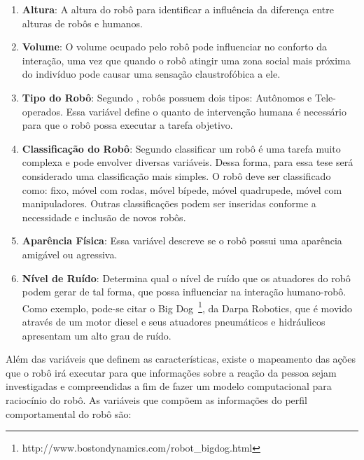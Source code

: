 \begin{enumerate}
	\item \textbf{Altura}: A altura do robô para identificar a influência da diferença entre alturas de robôs e humanos.
	\item \textbf{Volume}: O volume ocupado pelo robô pode influenciar no conforto da interação, uma vez que quando o robô atingir uma zona social mais próxima do indivíduo pode causar uma sensação claustrofóbica a ele.
	\item \textbf{Tipo do Robô}: Segundo , robôs possuem dois tipos: Autônomos e Tele-operados. Essa variável define o quanto de intervenção humana é necessário para que o robô possa executar a tarefa objetivo.
	\item \textbf{Classificação do Robô}: Segundo  classificar um robô é uma tarefa muito complexa e pode envolver diversas variáveis. Dessa forma, para essa tese será considerado uma classificação mais simples. O robô deve ser classificado como: fixo, móvel com rodas, móvel bípede, móvel quadrupede, móvel com manipuladores. Outras classificações podem ser inseridas conforme a necessidade e inclusão de novos robôs.
	\item \textbf{Aparência Física}: Essa variável descreve se o robô possui uma aparência amigável ou agressiva.
	\item \textbf{Nível de Ruído}: Determina qual o nível de ruído que os atuadores do robô podem gerar de tal forma, que possa influenciar na interação humano-robô. Como exemplo, pode-se citar o Big Dog~\footnote{http://www.bostondynamics.com/robot\_bigdog.html}, da Darpa Robotics, que é movido através de um motor diesel e seus atuadores pneumáticos e hidráulicos apresentam um alto grau de ruído.
\end{enumerate}

Além das variáveis que definem as características, existe o mapeamento das ações que o robô irá executar para que informações sobre a reação da pessoa sejam investigadas e compreendidas a fim de fazer um modelo computacional para raciocínio do robô. As variáveis que compõem as informações do perfil comportamental do robô são:

